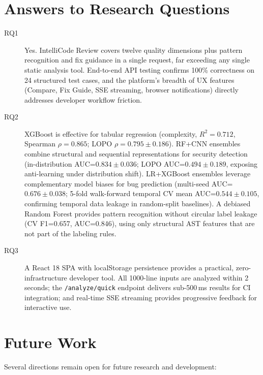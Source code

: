 \documentclass[12pt, oneside]{report}
\begin{document}
\section{Answers to Research Questions}
\label{sec:rq-answers}

\begin{description}
  \item[RQ1] Yes. IntelliCode Review covers twelve quality dimensions plus pattern
    recognition and fix guidance in a single request, far exceeding any single static
    analysis tool. End-to-end API testing confirms 100\% correctness on 24 structured
    test cases, and the platform's breadth of UX features (Compare, Fix Guide, SSE
    streaming, browser notifications) directly addresses developer workflow friction.
  \item[RQ2] XGBoost is effective for tabular regression (complexity,
    $R^2=0.712$, Spearman $\rho=0.865$; LOPO $\rho=0.795\pm0.186$).
    RF+CNN ensembles combine structural and sequential representations for security
    detection (in-distribution AUC=$0.834\pm0.036$; LOPO AUC=$0.494\pm0.189$,
    exposing anti-learning under distribution shift).
    LR+XGBoost ensembles leverage complementary model biases for bug prediction
    (multi-seed AUC=$0.676\pm0.038$; 5-fold walk-forward temporal CV
    mean AUC=$0.544\pm0.105$, confirming temporal data leakage in
    random-split baselines).
    A debiased Random Forest provides pattern recognition without circular
    label leakage (CV F1=0.657, AUC=0.846), using only structural AST features
    that are not part of the labeling rules.
  \item[RQ3] A React 18 SPA with localStorage persistence provides a practical,
    zero-infrastructure developer tool. All 1000-line inputs are analyzed within 2 seconds;
    the \texttt{/analyze/quick} endpoint delivers sub-500\,ms results for CI integration;
    and real-time SSE streaming provides progressive feedback for interactive use.
\end{description}

\section{Future Work}
\label{sec:future}

Several directions remain open for future research and development:
\end{document}
